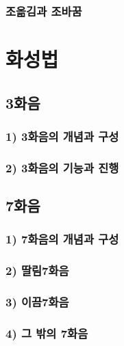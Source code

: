 \documentclass[12pt, a4paper, oneside]{book}
\let\stdsection\section
\renewcommand\section{\newpage\stdsection}
\begin{document}
	\subsection{조옮김과 조바꿈}




	\chapter{화성법}
	\noptcrule
	\parttoc				

%
	\section{3화음}

	\subsection{1) 3화음의 개념과 구성}

	\subsection{2) 3화음의 기능과 진행}

%
	\section{7화음}

	\subsection{1) 7화음의 개념과 구성}

	\subsection{2) 딸림7화음}

	\subsection{3) 이끔7화음}

	\subsection{4) 그 밖의 7화음}
\end{document}
